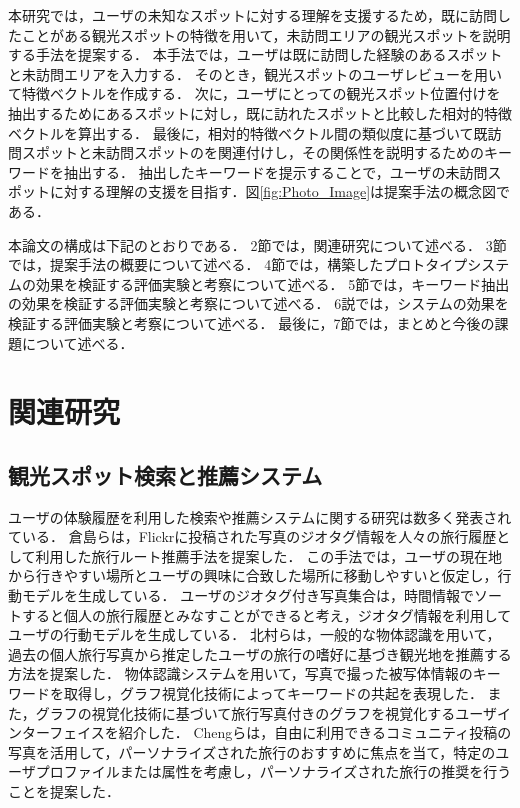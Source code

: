 \documentclass{deimj}
\begin{document}
本研究では，ユーザの未知なスポットに対する理解を支援するため，既に訪問したことがある観光スポットの特徴を用いて，未訪問エリアの観光スポットを説明する手法を提案する．
本手法では，ユーザは既に訪問した経験のあるスポットと未訪問エリアを入力する．
そのとき，観光スポットのユーザレビューを用いて特徴ベクトルを作成する．
次に，ユーザにとっての観光スポット位置付けを抽出するためにあるスポットに対し，既に訪れたスポットと比較した相対的特徴ベクトルを算出する．
最後に，相対的特徴ベクトル間の類似度に基づいて既訪問スポットと未訪問スポットのを関連付けし，その関係性を説明するためのキーワードを抽出する．
抽出したキーワードを提示することで，ユーザの未訪問スポットに対する理解の支援を目指す．図\ref{fig:Photo_Image}は提案手法の概念図である．

本論文の構成は下記のとおりである．
2節では，関連研究について述べる．
3節では，提案手法の概要について述べる．
4節では，構築したプロトタイプシステムの効果を検証する評価実験と考察について述べる．
5節では，キーワード抽出の効果を検証する評価実験と考察について述べる．
6説では，システムの効果を検証する評価実験と考察について述べる．
最後に，7節では，まとめと今後の課題について述べる．


\section{関連研究}
\label{sec:関連研究}
\subsection{観光スポット検索と推薦システム}
ユーザの体験履歴を利用した検索や推薦システムに関する研究は数多く発表されている．
倉島ら\cite{Codd01}は，Flickrに投稿された写真のジオタグ情報を人々の旅行履歴として利用した旅行ルート推薦手法を提案した．
この手法では，ユーザの現在地から行きやすい場所とユーザの興味に合致した場所に移動しやすいと仮定し，行動モデルを生成している．
ユーザのジオタグ付き写真集合は，時間情報でソートすると個人の旅行履歴とみなすことができると考え，ジオタグ情報を利用してユーザの行動モデルを生成している．
北村らは\cite{Codd02}，一般的な物体認識を用いて，過去の個人旅行写真から推定したユーザの旅行の嗜好に基づき観光地を推薦する方法を提案した．
物体認識システムを用いて，写真で撮った被写体情報のキーワードを取得し，グラフ視覚化技術によってキーワードの共起を表現した．
また，グラフの視覚化技術に基づいて旅行写真付きのグラフを視覚化するユーザインターフェイスを紹介した．
Chengらは\cite{Codd03}，自由に利用できるコミュニティ投稿の写真を活用して，パーソナライズされた旅行のおすすめに焦点を当て，特定のユーザプロファイルまたは属性を考慮し，パーソナライズされた旅行の推奨を行うことを提案した．
\end{document}
